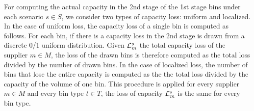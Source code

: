 \documentclass[a4paper,11pt]{article}
\begin{document}
	For computing the actual capacity in the 2nd stage of the 1st stage bins under each scenario $s \in S$, we consider two types of capacity loss: uniform and localized.
	In the case of uniform loss, the capacity loss of a single bin is computed as follows.
	For each bin, if there is a capacity loss in the 2nd stage is drawn from a discrete 0/1 uniform distribution.
	Given $ {\cal L}^s_m$ the total capacity loss of the supplier $ m \in M$, the loss of the drawn bins is therefore computed as the total loss divided by the number of drawn bins.
	In the case of localized loss, the number of bins that lose the entire capacity is computed as the the total loss divided by the capacity of the volume of one bin.
	This procedure is applied for every supplier $ m \in M$ and every bin type $ t \in T$, the loss of capacity $ {\cal L}^s_m$ is the same for every bin type.
	
\end{document}
